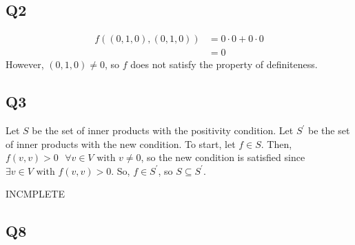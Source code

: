 \documentclass{article}
\begin{document}
\subsection*{Q2}
	\begin{align*}
		f((0, 1, 0), (0, 1, 0)) &= 0 \cdot 0 + 0\cdot 0\\
		&=0
	\end{align*}
	However, $(0, 1, 0) \neq 0$, so $f$ does not satisfy the property of definiteness.
	
\subsection*{Q3}
Let $S$ be the set of inner products with the positivity condition. 
Let  $S^\prime$ be the set of inner products with the new condition. To start, let $f \in S$. Then, $f(v, v) > 0 \text{ } \forall v \in V \text{ with } v \neq 0$, so the new condition is satisfied since $\exists v \in V \text{ with } f(v, v) > 0$. So, $f \in S^\prime$, so $S \subseteq S^\prime$. 
\begin{huge}
INCMPLETE
\end{huge}

\subsection*{Q8}
\end{document}
